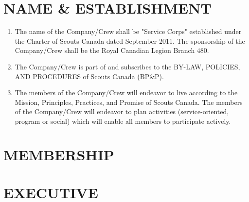 \documentclass{Service_Corps_Document}
\begin{document}
    \def \Title {Constitution}
    \def \Company {Service Corps}
    \def \versionNumber {4.2}
    \stdFooter
    \begin{titlepage}
        \stdTitlePage
    \end{titlepage}

    \tableofcontents

    \newpage


    \section{NAME \& ESTABLISHMENT}\label{sec:name-&-establishment}
    \begin{enumerate}
        \item The name of the Company/Crew shall be "Service Corps" established under the Charter of Scouts Canada dated September 2011.
        The sponsorship of the Company/Crew shall be the Royal Canadian Legion Branch 480.
        \item The Company/Crew is part of and subscribes to the BY-LAW, POLICIES, AND PROCEDURES of Scouts Canada (BP\&P).
        \item The members of the Company/Crew will endeavor to live according to the Mission, Principles, Practices, and Promise of Scouts Canada.
        The members of the Company/Crew will endeavor to plan activities (service-oriented, program or social) which will enable all members to participate actively.
    \end{enumerate}


    \section{MEMBERSHIP}\label{sec:membership}
    


    \section{EXECUTIVE}\label{sec:executive}
    
\end{document}
